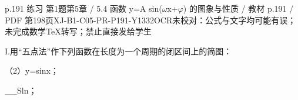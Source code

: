 \begin{bankitem}{p.191 练习 第1题}{第5章 / 5.4 函数 y=A sin(\ensuremath{\omega}x+\ensuremath{\varphi}) 的图象与性质 / 教材 p.191 / PDF 第198页}{XJ-B1-C05-PR-P191-Y1332}{OCR未校对：公式与文字均可能有误；未完成数学TeX转写；禁止直接发给学生}
\begin{ocrdraft}
\par
I.用“五点法”作下列函数在长度为一个周期的闭区间上的简图：
\par
（2）y=sinx；
\par
\_\_Sln；
\end{ocrdraft}
\end{bankitem}
